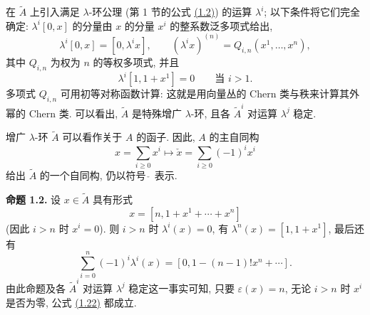 在 $\widetilde A$ 上引入满足 $\lambda$-环公理 (第 1 节的公式 \hyperlink{sga6.e00.eq.1-2.occ2}{(1.2)}) 的运算 $\lambda^i$; 以下条件将它们完全确定: $\lambda^i[0,x]$ 的分量由 $x$ 的分量 $x^i$ 的整系数泛多项式给出,
\begin{equation}\tag{1.20}
\lambda^i[0,x]=[0,\lambda^i x],\qquad (\lambda^i x)^{(n)}=Q_{i,n}(x^1,\ldots,x^n),
\end{equation}
其中 $Q_{i,n}$ 为权为 $n$ 的等权多项式, 并且
\begin{equation}\tag{1.21}
\lambda^i[1,1+x^1]=0\qquad\text{当 }i>1.
\end{equation}
多项式 $Q_{i,n}$ 可用初等对称函数计算: 这就是用向量丛的 Chern 类与秩来计算其外幂的 Chern 类. 可以看出, $\widetilde A$ 是特殊增广 $\lambda$-环, 且各 $\widetilde A^i$ 对运算 $\lambda^j$ 稳定.

增广 $\lambda$-环 $\widetilde A$ 可以看作关于 $A$ 的函子. 因此, $A$ 的主自同构
\[
x=\sum_{i\geq 0}x^i\longmapsto \check x=\sum_{i\geq 0}(-1)^i x^i
\]
给出 $\widetilde A$ 的一个自同构, 仍以符号 $\check{\ }$ 表示.

\textbf{命题 1.2.} 设 $x\in\widetilde A$ 具有形式
\[
x=[n,1+x^1+\cdots+x^n]
\]
(因此 $i>n$ 时 $x^i=0$). 则 $i>n$ 时 $\lambda^i(x)=0$, 有 $\lambda^n(x)=[1,1+x^1]$, 最后还有
\begin{equation}\tag{1.22}
\sum_{i=0}^{n}(-1)^i\lambda^i(x)=[0,1-(n-1)!x^n+\cdots].
\end{equation}
由此命题及各 $\widetilde A^i$ 对运算 $\lambda^j$ 稳定这一事实可知, 只要 $\varepsilon(x)=n$, 无论 $i>n$ 时 $x^i$ 是否为零, 公式 \hyperlink{sga6.e00.eq.1-22}{(1.22)} 都成立.

